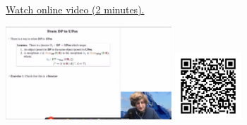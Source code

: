 
\begin{minipage}{10cm}
    \href{https://act4e-spring21.netlify.app/videos/spring2021-enrichment:from-dp-to-upos.html}{Watch online video (2 minutes).}
        
    \href{https://act4e-spring21.netlify.app/videos/spring2021-enrichment:from-dp-to-upos.html}{\includegraphics[height=3.5cm]{spring2021-enrichment:from-dp-to-upos/thumbnails.jpg}}
    \href{https://act4e-spring21.netlify.app/videos/spring2021-enrichment:from-dp-to-upos.html}{\includegraphics[height=2.5cm]{spring2021-enrichment:from-dp-to-upos/qrcode.png}}
\end{minipage}
